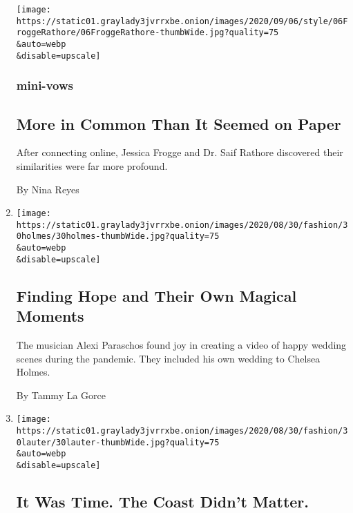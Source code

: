 \begin{enumerate}
  \texttt{[image: https://static01.graylady3jvrrxbe.onion/images/2020/09/06/style/06FroggeRathore/06FroggeRathore-thumbWide.jpg?quality=75\\\&auto=webp\\\&disable=upscale]}

  \hypertarget{mini-vows-2}{%
  \subsubsection{mini-vows}\label{mini-vows-2}}

  \hypertarget{more-in-common-than-it-seemed-on-paper}{%
  \subsection{More in Common Than It Seemed on
  Paper}\label{more-in-common-than-it-seemed-on-paper}}

  After connecting online, Jessica Frogge and Dr. Saif Rathore
  discovered their similarities were far more profound.

  By Nina Reyes
\item
  \href{/2020/08/28/fashion/weddings/finding-hope-and-their-own-magical-moments.html}{}

  \texttt{[image: https://static01.graylady3jvrrxbe.onion/images/2020/08/30/fashion/30holmes/30holmes-thumbWide.jpg?quality=75\\\&auto=webp\\\&disable=upscale]}

  \hypertarget{finding-hope-and-their-own-magical-moments}{%
  \subsection{Finding Hope and Their Own Magical
  Moments}\label{finding-hope-and-their-own-magical-moments}}

  The musician Alexi Paraschos found joy in creating a video of happy
  wedding scenes during the pandemic. They included his own wedding to
  Chelsea Holmes.

  By Tammy La Gorce
\item
  \href{/2020/08/28/fashion/weddings/it-was-time-the-coast-didnt-matter.html}{}

  \texttt{[image: https://static01.graylady3jvrrxbe.onion/images/2020/08/30/fashion/30lauter/30lauter-thumbWide.jpg?quality=75\\\&auto=webp\\\&disable=upscale]}

  \hypertarget{it-was-time-the-coast-didnt-matter}{%
  \subsection{It Was Time. The Coast Didn't
  Matter.}\label{it-was-time-the-coast-didnt-matter}}


\end{enumerate}
